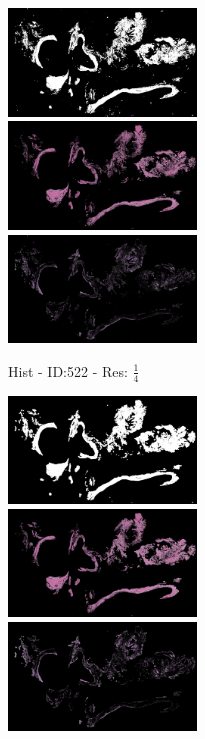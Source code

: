 \documentclass[a4paper,10pt,oneside]{article}
\begin{document}
\begin{figure}[hbtp]
\begin{subfigure}[b]{5cm}
    \includegraphics[width=5cm]{visualization/results/histogramSeg/res_reduce_4/Region_0_PO13-00522A1_1_2_201305171639.png}
    \includegraphics[width=5cm]{visualization/results/histogramSeg/res_reduce_4/Region_1_PO13-00522A1_1_2_201305171639.png}
    \includegraphics[width=5cm]{visualization/results/histogramSeg/res_reduce_4/Region_2_PO13-00522A1_1_2_201305171639.png}
    \caption{Hist - ID:522 - Res: $\frac{1}{4}$}
  \end{subfigure}
  \begin{subfigure}[b]{5cm}
    \includegraphics[width=5cm]{visualization/results/histogramSeg/res_reduce_5/Region_0_PO13-00522A1_1_2_201305171639.png}
    \includegraphics[width=5cm]{visualization/results/histogramSeg/res_reduce_5/Region_1_PO13-00522A1_1_2_201305171639.png}
    \includegraphics[width=5cm]{visualization/results/histogramSeg/res_reduce_5/Region_2_PO13-00522A1_1_2_201305171639.png}

\end{subfigure}
\end{figure}
\end{document}
